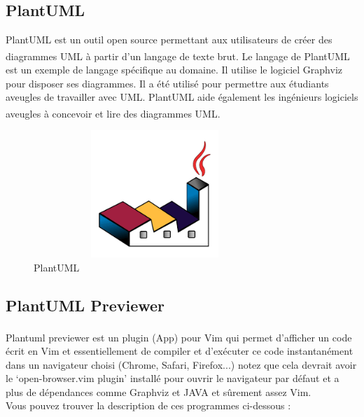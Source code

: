 \documentclass[12pt]{report}
\begin{document}
\vspace{-0.1in}
\subsection{PlantUML}
PlantUML est un outil open source permettant aux utilisateurs de cr\'eer des diagrammes UML \`a partir d'un langage de texte brut. Le langage de PlantUML\textsuperscript{\cite{roques2017plantuml}} est un exemple de langage sp\'ecifique au domaine. Il utilise le logiciel Graphviz pour disposer ses diagrammes. Il a \'et\'e utilis\'e pour permettre aux \'etudiants aveugles de travailler avec UML\@. PlantUML aide \'egalement les ing\'enieurs logiciels aveugles \`a concevoir et lire des diagrammes UML\@.\textsuperscript{\cite{booch2005unified}}

\vspace{-0.2in}

\begin{figure}[h]
\centering
    \includegraphics[width = 3.6in, height = 1.9in]{../Images/plantuml.png}
\vspace{-0.1in}
\caption{PlantUML}
\end{figure}

\newpage

\subsection{PlantUML Previewer}
Plantuml previewer est un plugin (App) pour Vim\textsuperscript{\cite{vim}} qui permet d'afficher un code écrit en Vim et essentiellement de compiler et d'exécuter ce code instantanément dans un navigateur choisi (Chrome, Safari, Firefox...) notez que cela devrait avoir le `open-browser.vim  plugin' installé pour ouvrir le navigateur par défaut et a plus de dépendances comme Graphviz et JAVA et sûrement assez Vim.
\\
Vous pouvez trouver la description de ces programmes ci-dessous :

\vspace{0.05in}
\end{document}
